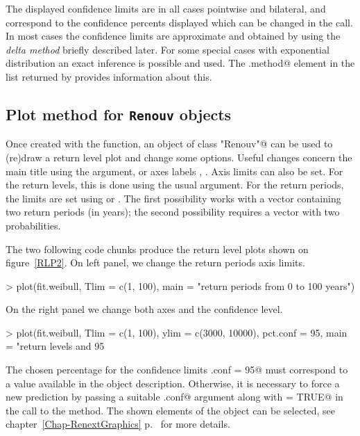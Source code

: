 \documentclass[a4paper]{report}
\begin{document}
The displayed confidence limits are in all cases pointwise and
bilateral, and correspond to the confidence percents displayed which
can be changed in the call. In most cases the confidence limits are
approximate and obtained by using the \textit{delta method} briefly 
described later. 
%
For some special cases with exponential distribution an exact
inference is possible and used. The \verb@infer.method@ element in the
list returned by \verb@Renouv@ provides information about this.

\subsection{Plot method for \texttt{Renouv} objects} 
\label{plot.Renouv}
Once created with the \verb@Renouv@ function, an object of class
\verb@"Renouv"@ can be used to (re)draw a return level plot and change
some options. Useful changes concern the main title using the
\verb@main@ argument, or axes labels \verb@xlab@, \verb@ylab@.  Axis
limits can also be set.  For the return levels, this is done using the
usual \verb@ylim@ argument.  For the return periods, the limits are
set using \verb@Tlim@ or \verb@problim@.  The first possibility works
with a vector containing two return periods (in years); the second
possibility requires a vector with two probabilities.


The two following code chunks produce the return level plots shown on
figure~\ref{RLP2}.  On left panel, we change the return periods axis
limits.

\begin{Schunk}
\begin{Sinput}
> plot(fit.weibull,  Tlim = c(1, 100), main = "return periods from 0 to 100 years")
\end{Sinput}
\end{Schunk}

\noindent
On the right panel we change both axes and the confidence level.

\begin{Schunk}
\begin{Sinput}
> plot(fit.weibull, Tlim = c(1, 100), ylim = c(3000, 10000), pct.conf = 95,
       main = "return levels and 95%
\end{Sinput}
\end{Schunk}

\noindent
The chosen percentage for the confidence limits \verb@pct.conf = 95@
must correspond to a value available in the object description.
Otherwise, it is necessary to force a new prediction by passing a
suitable \verb@pct.conf@ argument along with \verb@predict = TRUE@ in
the call to the \verb@plot@ method.  The shown elements of the
\verb@Renouv@ object can be selected, see
chapter~\ref{Chap-RenextGraphics} p.~\pageref{Chap-RenextGraphics} for
more details.
\end{document}
